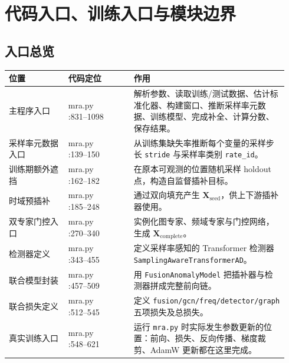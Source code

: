 \documentclass[UTF8]{ctexart}
\newcommand{\codecell}[1]{\parbox[t]{\linewidth}{\raggedright\ttfamily\small #1}}
\begin{document}
\section{代码入口、训练入口与模块边界}

\subsection{入口总览}

{\small
\begin{longtable}{@{}>{\raggedright\arraybackslash}p{0.20\linewidth} >{\raggedright\arraybackslash}p{0.22\linewidth} >{\raggedright\arraybackslash}p{0.52\linewidth}@{}}
\toprule
位置 & 代码定位 & 作用 \\
\midrule
\endhead
主程序入口 & \codecell{mra.py\\:831--1098} & 解析参数、读取训练/测试数据、估计标准化器、构建窗口、推断采样率元数据、训练模型、完成补全、计算分数、保存结果。 \\
采样率元数据入口 & \codecell{mra.py\\:139--150} & 从训练集缺失率推断每个变量的采样步长 \texttt{stride} 与采样率类别 \texttt{rate\_id}。 \\
训练期额外遮挡 & \codecell{mra.py\\:162--182} & 在原本可观测的位置随机采样 holdout 点，构造自监督插补目标。 \\
时域预插补 & \codecell{mra.py\\:185--248} & 通过双向填充产生 \(\bm{X}_{\text{seed}}\)，供上下游插补器使用。 \\
双专家门控入口 & \codecell{mra.py\\:270--340} & 实例化图专家、频域专家与门控网络，生成 \(\bm{X}_{\text{complete}}\)。 \\
检测器定义 & \codecell{mra.py\\:343--455} & 定义采样率感知的 Transformer 检测器 \texttt{SamplingAwareTransformerAD}。 \\
联合模型封装 & \codecell{mra.py\\:457--509} & 用 \texttt{FusionAnomalyModel} 把插补器与检测器拼成完整前向链。 \\
联合损失定义 & \codecell{mra.py\\:512--545} & 定义 \texttt{fusion/gcn/freq/detector/graph} 五项损失及总损失。 \\
真实训练入口 & \codecell{mra.py\\:548--621} & 运行 \texttt{mra.py} 时实际发生参数更新的位置：前向、损失、反向传播、梯度裁剪、AdamW 更新都在这里完成。 \\

\end{longtable}}
\end{document}
